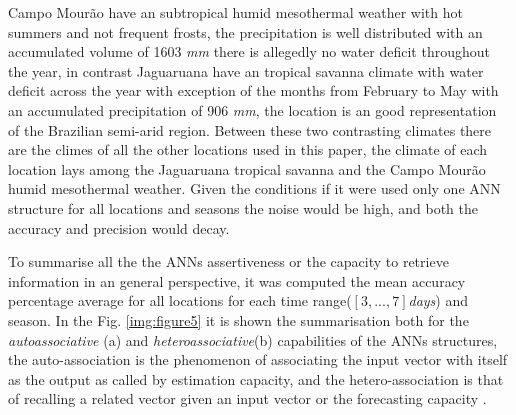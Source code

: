 Campo Mourão have an subtropical humid mesothermal weather with hot summers and not frequent frosts, the precipitation is well distributed with an accumulated volume of 1603 \textit{mm} there is allegedly no water deficit throughout the year, in contrast Jaguaruana have an tropical savanna climate with water deficit across the year with exception of the months from February to May with an accumulated precipitation of 906 \textit{mm}, the location is an  good representation of the Brazilian semi-arid region. Between these two contrasting climates there are the climes of all the other locations used in this paper, the climate of each location lays among the Jaguaruana tropical savanna and the Campo Mourão humid mesothermal weather. Given the conditions if it were used only one ANN structure for all locations and seasons the noise would be high, and both the accuracy and precision would decay. 

To summarise all the the ANNs assertiveness or the capacity to retrieve information in an general perspective, it was computed the mean accuracy percentage average for all locations for each time range($[3,...,7]$\textit{days}) and season. In the Fig. \ref{img:figure5} it is shown the summarisation both for the \textit{autoassociative} (a) and \textit{heteroassociative}(b) capabilities of the ANNs structures, the auto-association is the phenomenon of associating the input vector with itself as the output as called by estimation capacity, and the hetero-association is that of recalling a related vector given an input vector or the forecasting capacity \cite{rao1995c++}. 


